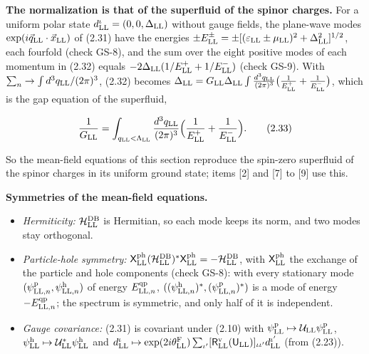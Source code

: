\documentclass[
  10pt,
]{article}
\providecommand{\tightlist}{%
  \setlength{\itemsep}{0pt}\setlength{\parskip}{0pt}}
\begin{document}
\textbf{The normalization is that of the superfluid of the spinor
charges.} For a uniform polar state
\(d^\iota_{\rm LL}=(0,0,\Delta_{\rm LL})\) without gauge fields, the
plane-wave modes \(\exp(i\vec q_{\rm LL}\cdot\vec x_{\rm LL})\) of
(2.31) have the energies
\(\pm E^\pm_{\rm LL}=\pm[(\varepsilon_{\rm LL}\pm\mu_{\rm LL})^2+\Delta_{\rm LL}^2]^{1/2}\),
each fourfold (check GS-8), and the sum over the eight positive modes of
each momentum in (2.32) equals
\(-2\Delta_{\rm LL}(1/E^+_{\rm LL}+1/E^-_{\rm LL})\) (check GS-9). With
\(\sum_n\to\int d^3q_{\rm LL}/(2\pi)^3\), (2.32) becomes
\(\Delta_{\rm LL}=G_{\rm LL}\Delta_{\rm LL}\int\frac{d^3q_{\rm LL}}{(2\pi)^3}\big(\frac1{E^+_{\rm LL}}+\frac1{E^-_{\rm LL}}\big)\),
which is the gap equation of the superfluid,

\[\frac1{G_{\rm LL}}=\int_{q_{\rm LL}<\Lambda_{\rm LL}}\frac{d^3q_{\rm LL}}{(2\pi)^3}\Big(\frac1{E^+_{\rm LL}}+\frac1{E^-_{\rm LL}}\Big).\tag{2.33}\]

So the mean-field equations of this section reproduce the spin-zero
superfluid of the spinor charges in its uniform ground state; items
{[}2{]} and {[}7{]} to {[}9{]} use this.

\textbf{Symmetries of the mean-field equations.}

\begin{itemize}
\tightlist
\item
  \emph{Hermiticity:} \(\mathcal H^{\rm DB}_{\rm LL}\) is Hermitian, so
  each mode keeps its norm, and two modes stay orthogonal.
\item
  \emph{Particle-hole symmetry:}
  \(\mathsf X^{\rm ph}_{\rm LL}(\mathcal H^{\rm DB}_{\rm LL})^*\mathsf X^{\rm ph}_{\rm LL}=-\mathcal H^{\rm DB}_{\rm LL}\),
  with \(\mathsf X^{\rm ph}_{\rm LL}\) the exchange of the particle and
  hole components (check GS-8): with every stationary mode
  \((\psi^{\rm p}_{{\rm LL},n},\psi^{\rm h}_{{\rm LL},n})\) of energy
  \(E^{\rm qp}_{{\rm LL},n}\),
  \(((\psi^{\rm h}_{{\rm LL},n})^*,(\psi^{\rm p}_{{\rm LL},n})^*)\) is a
  mode of energy \(-E^{\rm qp}_{{\rm LL},n}\); the spectrum is
  symmetric, and only half of it is independent.
\item
  \emph{Gauge covariance:} (2.31) is covariant under (2.10) with
  \(\psi^{\rm p}_{\rm LL}\mapsto\mathcal U_{\rm LL}\psi^{\rm p}_{\rm LL}\),
  \(\psi^{\rm h}_{\rm LL}\mapsto\mathcal U^*_{\rm LL}\psi^{\rm h}_{\rm LL}\)
  and
  \(d^\iota_{\rm LL}\mapsto\exp(2i\theta^{\rm F}_{\rm LL})\sum_{\iota'}[\mathsf R^{\rm v}_{\rm LL}(\mathsf U_{\rm LL})]_{\iota\iota'}d^{\iota'}_{\rm LL}\)
  (from (2.23)).
\end{itemize}
\end{document}
